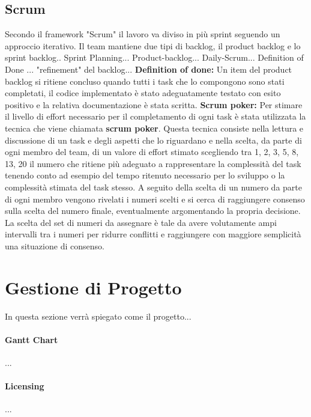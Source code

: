     \subsection{Scrum}
    Secondo il framework "Scrum" il lavoro va diviso in più sprint seguendo un approccio iterativo. Il team mantiene due tipi di backlog, il product backlog e lo sprint backlog.. Sprint Planning... Product-backlog... Daily-Scrum... Definition of Done ... "refinement" del backlog... 
    \linebreak\linebreak
    \textbf{Definition of done:} Un item del product backlog si ritiene concluso quando tutti i task che lo compongono sono stati completati, il codice implementato è stato adeguatamente testato con esito positivo e la relativa documentazione è stata scritta.
    \linebreak\linebreak
    \textbf{Scrum poker:} Per stimare il livello di effort necessario per il completamento di ogni task è stata utilizzata la tecnica che viene chiamata \textbf{scrum poker}. Questa tecnica consiste nella lettura e discussione di un task e degli aspetti che lo riguardano e nella scelta, da parte di ogni membro del team, di un valore di effort stimato scegliendo tra 1, 2, 3, 5, 8, 13, 20 il numero che ritiene più adeguato a rappresentare la complessità del task tenendo conto ad esempio del tempo ritenuto necessario per lo sviluppo o la complessità stimata del task stesso. A seguito della scelta di un numero da parte di ogni membro vengono rivelati i numeri scelti e si cerca di raggiungere consenso sulla scelta del numero finale, eventualmente argomentando la propria decisione. La scelta del set di numeri da assegnare è tale da avere volutamente ampi intervalli tra i numeri per ridurre conflitti e raggiungere con maggiore semplicità una situazione di consenso.

\section{Gestione di Progetto}
In questa sezione verrà spiegato come il progetto...
    \paragraph{Gantt Chart} 
    ... 
    
    \paragraph{Licensing} 
    ...
    
